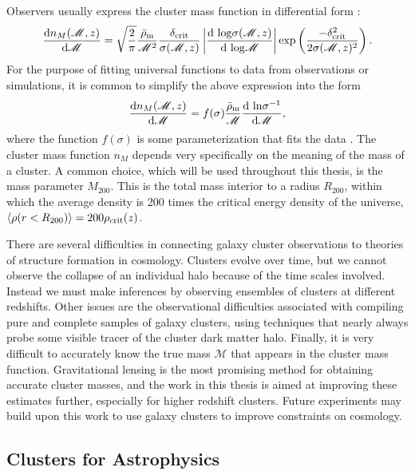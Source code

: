 Observers usually express the cluster mass function in differential form \citep{Borgani08}:
\begin{equation}
\label{eqn:diffmassfunc}
\frac{{\rm d} n_M ({\mathscr M},z)}{{\rm d}{\mathscr M}} = \sqrt{\frac{2}{\pi}} \frac{\bar{\rho}_{\rm m}}{{\mathscr M}^2} \frac{\delta_{\rm crit}}{\sigma({\mathscr M},z)} \left| \frac{{\rm d \ log}\sigma({\mathscr M},z)}{{\rm d \ log}{\mathscr M}} \right| {\rm exp}\left( \frac{-\delta_{\rm crit}^2}{2\sigma({\mathscr M},z)^2} \right).
\end{equation}
For the purpose of fitting universal functions to data from observations or simulations, it is common to simplify the above expression into the form
\begin{equation}
\frac{{\rm d} n_M ({\mathscr M},z)}{{\rm d}{\mathscr M}} = f(\sigma) \frac{\bar{\rho}_{\rm m}}{\mathscr M} \frac{{\rm d \ ln}\sigma^{-1}}{{\rm d}{\mathscr M}},
\end{equation}
where the function $f(\sigma)$ is some parameterization that fits the data \citep[see e.g.][]{Tinker08}. The cluster mass function $n_M$ depends very specifically on the meaning of the mass of a cluster. A common choice, which will be used throughout this thesis, is the mass parameter $M_{200}$. This is the total mass interior to a radius $R_{200}$, within which the average density is 200 times the critical energy density of the universe, $\langle \rho (r<R_{200}) \rangle = 200 \rho_{\rm crit}(z)$.

There are several difficulties in connecting galaxy cluster observations to theories of structure formation in cosmology. Clusters evolve over time, but we cannot observe the collapse of an individual halo because of the time scales involved. Instead we must make inferences by observing ensembles of clusters at different redshifts. Other issues are the observational difficulties associated with compiling pure and complete samples of galaxy clusters, using techniques that nearly always probe some visible tracer of the cluster dark matter halo. Finally, it is very difficult to accurately know the true mass ${\mathscr M}$ that appears in the cluster mass function. Gravitational lensing is the most promising method for obtaining accurate cluster masses, and the work in this thesis is aimed at improving these estimates further, especially for higher redshift clusters. Future experiments may build upon this work to use galaxy clusters to improve constraints on cosmology.

\subsection{Clusters for Astrophysics}
\label{sec:ClusterAstro}


